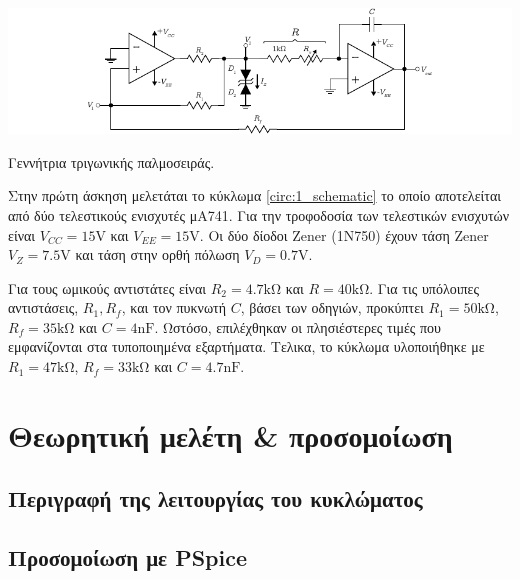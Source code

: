 \begin{center}
	\begin{circuitfig}[H]
		\includegraphics[width=14cm]{circuits/micro3_lab1.pdf}
		\caption{Γεννήτρια τριγωνικής παλμοσειράς.}
		\label{circ:1_schematic}
	\end{circuitfig}
\end{center}
\vspace*{-1cm}

Στην πρώτη άσκηση μελετάται το κύκλωμα \ref{circ:1_schematic} το οποίο αποτελείται από δύο τελεστικούς ενισχυτές μΑ741. Για την τροφοδοσία των τελεστικών ενισχυτών είναι $V_{CC}=15\unit{\volt}$ και $V_{EE}=15\unit{\volt}$. Οι δύο δίοδοι Zener (1N750) έχουν τάση Zener $V_Z=7.5\unit{\volt}$ και τάση στην ορθή πόλωση $V_D=0.7\unit{\volt}$.\par
Για τους ωμικούς αντιστάτες είναι $R_2=4.7\unit{\kilo\ohm}$ και $R=40\unit{\kilo\ohm}$. Για τις υπόλοιπες αντιστάσεις, $R_1,R_f$, και τον πυκνωτή $C$, βάσει των οδηγιών, προκύπτει $R_1=50\unit{\kilo\ohm}$, $R_f=35\unit{\kilo\ohm}$ και $C=4\unit{\nano\farad}$. Ωστόσο, επιλέχθηκαν οι πλησιέστερες τιμές που εμφανίζονται στα τυποποιημένα εξαρτήματα. Τελικα, το κύκλωμα υλοποιήθηκε με $R_1=47\unit{\kilo\ohm}$, $R_f=33\unit{\kilo\ohm}$ και $C=4.7\unit{\nano\farad}$.\par

\section{Θεωρητική μελέτη \& προσομοίωση}

	\subsection{Περιγραφή της λειτουργίας του κυκλώματος}
		

	\subsection{Προσομοίωση με PSpice}
		


